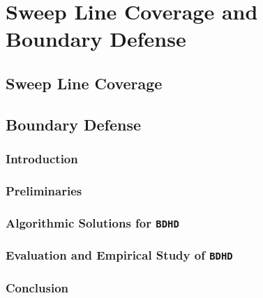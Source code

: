 
\chapter{Sweep Line Coverage and Boundary Defense}
\thispagestyle{myheadings}
\section{Sweep Line Coverage}







\section{Boundary Defense}
\def\prob{{\texttt{{BDHD}}}\xspace}
\def\ours{{{{EDP}}}\xspace}
\def\oours{{{{OEDP}}}\xspace}
\subsection{Introduction}
\label{sec:bd-intro}
\subsection{Preliminaries}\label{sec:bd-preliminary}

\subsection{Algorithmic Solutions for \prob}\label{sec:bd-algorithm}

\subsection{Evaluation and Empirical Study of \prob}\label{sec:bd-evaluation}

\subsection{Conclusion}\label{sec:bd-conclusion}
